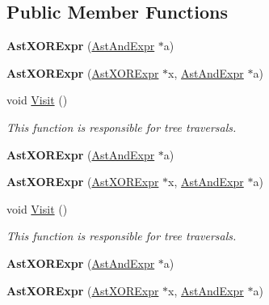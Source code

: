 \subsection*{Public Member Functions}
\begin{DoxyCompactItemize}
\item 
\hypertarget{classAstXORExpr_a04ca42d403c3e4d69a0b9c6e22aff25b}{{\bfseries Ast\-X\-O\-R\-Expr} (\hyperlink{classAstAndExpr}{Ast\-And\-Expr} $\ast$a)}\label{classAstXORExpr_a04ca42d403c3e4d69a0b9c6e22aff25b}

\item 
\hypertarget{classAstXORExpr_a1481a0957bc4aee1819caa848f2f5a2d}{{\bfseries Ast\-X\-O\-R\-Expr} (\hyperlink{classAstXORExpr}{Ast\-X\-O\-R\-Expr} $\ast$x, \hyperlink{classAstAndExpr}{Ast\-And\-Expr} $\ast$a)}\label{classAstXORExpr_a1481a0957bc4aee1819caa848f2f5a2d}

\item 
void \hyperlink{classAstXORExpr_a6742a6024309a1359fe029204ca50c4f}{Visit} ()
\begin{DoxyCompactList}\small\item\em This function is responsible for tree traversals. \end{DoxyCompactList}\item 
\hypertarget{classAstXORExpr_a04ca42d403c3e4d69a0b9c6e22aff25b}{{\bfseries Ast\-X\-O\-R\-Expr} (\hyperlink{classAstAndExpr}{Ast\-And\-Expr} $\ast$a)}\label{classAstXORExpr_a04ca42d403c3e4d69a0b9c6e22aff25b}

\item 
\hypertarget{classAstXORExpr_a1481a0957bc4aee1819caa848f2f5a2d}{{\bfseries Ast\-X\-O\-R\-Expr} (\hyperlink{classAstXORExpr}{Ast\-X\-O\-R\-Expr} $\ast$x, \hyperlink{classAstAndExpr}{Ast\-And\-Expr} $\ast$a)}\label{classAstXORExpr_a1481a0957bc4aee1819caa848f2f5a2d}

\item 
void \hyperlink{classAstXORExpr_a6742a6024309a1359fe029204ca50c4f}{Visit} ()
\begin{DoxyCompactList}\small\item\em This function is responsible for tree traversals. \end{DoxyCompactList}\item 
\hypertarget{classAstXORExpr_a04ca42d403c3e4d69a0b9c6e22aff25b}{{\bfseries Ast\-X\-O\-R\-Expr} (\hyperlink{classAstAndExpr}{Ast\-And\-Expr} $\ast$a)}\label{classAstXORExpr_a04ca42d403c3e4d69a0b9c6e22aff25b}

\item 
\hypertarget{classAstXORExpr_a1481a0957bc4aee1819caa848f2f5a2d}{{\bfseries Ast\-X\-O\-R\-Expr} (\hyperlink{classAstXORExpr}{Ast\-X\-O\-R\-Expr} $\ast$x, \hyperlink{classAstAndExpr}{Ast\-And\-Expr} $\ast$a)}\label{classAstXORExpr_a1481a0957bc4aee1819caa848f2f5a2d}


\end{DoxyCompactItemize}
